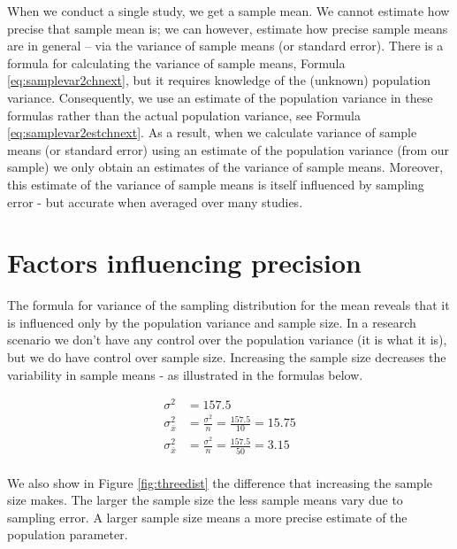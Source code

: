 \documentclass[
]{krantz}
\begin{document}
When we conduct a single study, we get a sample mean. We cannot estimate how precise that sample mean is; we can however, estimate how precise sample means are in general -- via the variance of sample means (or standard error). There is a formula for calculating the variance of sample means, Formula \eqref{eq:samplevar2chnext}, but it requires knowledge of the (unknown) population variance. Consequently, we use an estimate of the population variance in these formulas rather than the actual population variance, see Formula \eqref{eq:samplevar2estchnext}. As a result, when we calculate variance of sample means (or standard error) using an estimate of the population variance (from our sample) we only obtain an estimates of the variance of sample means. Moreover, this estimate of the variance of sample means is itself influenced by sampling error - but accurate when averaged over many studies.

\hypertarget{factors-influencing-precision}{%
\section{Factors influencing precision}\label{factors-influencing-precision}}

The formula for variance of the sampling distribution for the mean reveals that it is influenced only by the population variance and sample size. In a research scenario we don't have any control over the population variance (it is what it is), but we do have control over sample size. Increasing the sample size decreases the variability in sample means - as illustrated in the formulas below.

\[
\begin{aligned} 
\sigma^2 &= 157.5 \\
\sigma_{\bar{x}}^2 &= \frac{\sigma^2}{n} = \frac{157.5}{10} = 15.75 \\
\sigma_{\bar{x}}^2 &= \frac{\sigma^2}{n} = \frac{157.5}{50} = 3.15 \\
\end{aligned} 
\]

We also show in Figure \ref{fig:threedist} the difference that increasing the sample size makes. The larger the sample size the less sample means vary due to sampling error. A larger sample size means a more precise estimate of the population parameter.
\end{document}
